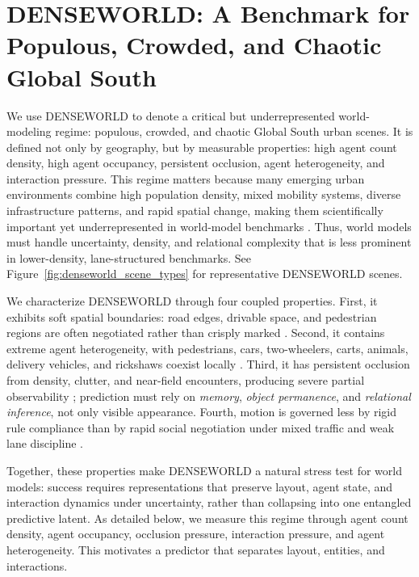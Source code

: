 





\section{DENSEWORLD: A Benchmark for Populous, Crowded, and Chaotic Global South}

We use DENSEWORLD to denote a critical but underrepresented world-modeling regime: populous, crowded, and chaotic Global South urban scenes. It is defined not only by geography, but by measurable properties: high agent count density, high agent occupancy, persistent occlusion, agent heterogeneity, and interaction pressure. This regime matters because many emerging urban environments combine high population density, mixed mobility systems, diverse infrastructure patterns, and rapid spatial change, making them scientifically important yet underrepresented in world-model benchmarks \cite{mahendra2021seven,ellis2016leveraging}. Thus, world models must handle uncertainty, density, and relational complexity that is less prominent in lower-density, lane-structured benchmarks. See Figure~\ref{fig:denseworld_scene_types} for representative DENSEWORLD scenes.




We characterize DENSEWORLD through four coupled properties. First, it exhibits soft spatial boundaries: road edges, drivable space, and pedestrian regions are often negotiated rather than crisply marked \cite{varma2019idd, dokania2023idd3d}. Second, it contains extreme agent heterogeneity, with pedestrians, cars, two-wheelers, carts, animals, delivery vehicles, and rickshaws coexist locally \cite{khan1999heterogeneous,asaithambi2012mixedtraffic}. Third, it has persistent occlusion from density, clutter, and near-field encounters, producing severe partial observability \cite{varma2019idd, dokania2023idd3d}; prediction must rely on \emph{memory}, \emph{object permanence}, and \emph{relational inference}, not only visible appearance. Fourth, motion is governed less by rigid rule compliance than by rapid social negotiation under mixed traffic and weak lane discipline \cite{papathanasopoulou2018weaklane,asaithambi2012mixedtraffic}.

Together, these properties make DENSEWORLD a natural stress test for world models: success requires representations that preserve layout, agent state, and interaction dynamics under uncertainty, rather than collapsing into one entangled predictive latent. As detailed below, we measure this regime through agent count density, agent occupancy, occlusion pressure, interaction pressure, and agent heterogeneity. This motivates a predictor that separates layout, entities, and interactions.

